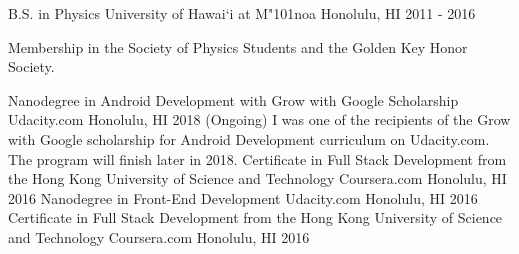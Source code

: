 \begin{cventries}
	\cventry
	{B.S. in Physics}
	{University of Hawai`i at M{\char"101}noa}
	{Honolulu, HI}
	{2011 - 2016}
	{
	  \begin{cvitems}
	    \item {Membership in the Society of Physics Students and the Golden Key Honor Society.}
	  \end{cvitems}
	}
	\cventry
	{Nanodegree in Android Development with Grow with Google Scholarship}
	{Udacity.com}
	{Honolulu, HI}
	{2018 (Ongoing)}
	{I was one of the recipients of the Grow with Google scholarship for Android Development curriculum on Udacity.com. The program will finish later in 2018.}  
	\cventry
	{Certificate in Full Stack Development from the Hong Kong University of Science and Technology}
	{Coursera.com}
	{Honolulu, HI}
	{2016}
	{}  
	\cventry
	{Nanodegree in Front-End Development}
	{Udacity.com}
	{Honolulu, HI}
	{2016}
	{}  
	\cventry
	{Certificate in Full Stack Development from the Hong Kong University of Science and Technology}
	{Coursera.com}
	{Honolulu, HI}
	{2016}
	{}  
\end{cventries}

